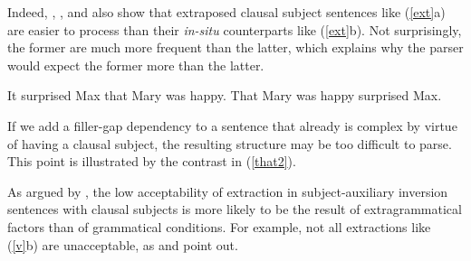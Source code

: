\documentclass[output=paper
 	        ,biblatex
                ,babelshorthands
                ,newtxmath
                ,draftmode
                ,colorlinks, citecolor=brown
]{langscibook}
\begin{document}
\eal  \label{exps}
\zl


\noindent
  Indeed, \citet{fodor67},  \citet{bever}, and \citet{frazier88} also
 show that extraposed clausal subject sentences
 like (\ref{ext}a) are easier to process than
their \textit{in-situ} counterparts like (\ref{ext}b). 
Not surprisingly,  the former are much more frequent than the latter,
which  explains why the parser would expect the former more than the latter.


\eal  \label{ext}
\ex It surprised Max that Mary was happy. 
\ex That Mary was happy surprised Max.
\zl








  
  
  
  If we add a filler-gap dependency to a sentence that already is complex by
  virtue of having  a clausal  subject, the resulting structure
  may be too difficult to parse.  This   point is illustrated by
  the contrast in (\ref{that2}).



\eal \label{that2}
\zl


\noindent
As argued by \citet{dubinsky2009}, the low acceptability
 of extraction in subject-auxiliary inversion sentences with clausal subjects 
  is more likely to be the result of extragrammatical factors than of grammatical conditions.
For example,  not all extractions like (\ref{v}b) are unacceptable, as
\citet[382--387]{delahunty} and
\citet[115]{dubinsky2009} point out. 

\eal \label{v}
\zl
\end{document}
